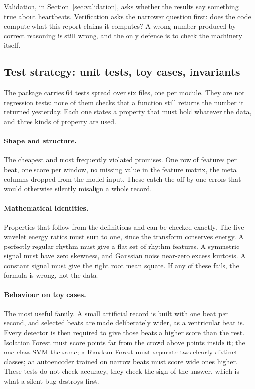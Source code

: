 \documentclass[a4paper, 12pt]{article}
\begin{document}
Validation, in Section~\ref{sec:validation}, asks whether the results say something
true about heartbeats. Verification asks the narrower question first: does the code
compute what this report claims it computes? A wrong number produced by correct
reasoning is still wrong, and the only defence is to check the machinery itself.

\subsection{Test strategy: unit tests, toy cases, invariants}
\label{subsec:teststrategy}

The package carries 64 tests spread over six files, one per module. They are not
regression tests: none of them checks that a function still returns the number it
returned yesterday. Each one states a property that must hold whatever the data,
and three kinds of property are used.

\paragraph{Shape and structure.} The cheapest and most frequently violated
promises. One row of features per beat, one score per window, no missing value in
the feature matrix, the meta columns dropped from the model input. These catch the
off-by-one errors that would otherwise silently misalign a whole record.

\paragraph{Mathematical identities.} Properties that follow from the definitions
and can be checked exactly. The five wavelet energy ratios must sum to one, since
the transform conserves energy. A perfectly regular rhythm must give a flat set of
rhythm features. A symmetric signal must have zero skewness, and Gaussian noise
near-zero excess kurtosis. A constant signal must give the right root mean square.
If any of these fails, the formula is wrong, not the data.

\paragraph{Behaviour on toy cases.} The most useful family. A small artificial
record is built with one beat per second, and selected beats are made deliberately
wider, as a ventricular beat is. Every detector is then required to give those
beats a higher score than the rest. Isolation Forest must score points far from the
crowd above points inside it; the one-class SVM the same; a Random Forest must
separate two clearly distinct classes; an autoencoder trained on narrow beats must
score wide ones higher. These tests do not check accuracy, they check the sign of
the answer, which is what a silent bug destroys first.
\end{document}
